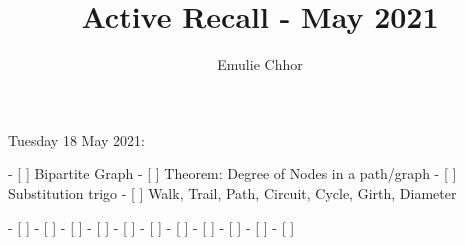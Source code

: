 \documentclass{article}
\begin{document}
\title{Active Recall - May 2021}
\author{Emulie Chhor}
\maketitle

Tuesday 18 May 2021:

- [ ] Bipartite Graph
- [ ] Theorem: Degree of Nodes in a path/graph
- [ ] Substitution trigo
- [ ] Walk, Trail, Path, Circuit, Cycle, Girth, Diameter



- [ ]
- [ ]
- [ ]
- [ ]
- [ ]
- [ ]
- [ ]
- [ ]
- [ ]
- [ ]
- [ ]
\end{document}
